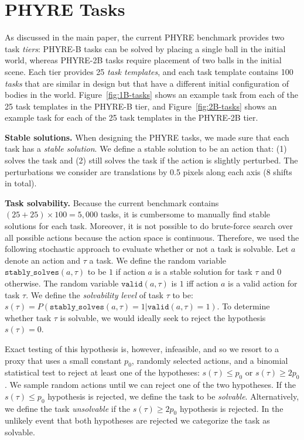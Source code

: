 \documentclass{article}
\begin{document}
\section{PHYRE Tasks}

As discussed in the main paper, the current PHYRE benchmark provides two task \emph{tiers}:
PHYRE-B tasks can be solved by placing a single ball in the initial world, whereas PHYRE-2B tasks require placement of two balls in the initial scene. Each tier provides 25 \emph{task templates},
and each task template contains 100 \emph{tasks} that are similar in design but that have a different initial configuration of bodies in the world. Figure~\ref{fig:1B-tasks} shows an example task from each of the 25 task templates in
the PHYRE-B tier, and Figure~\ref{fig:2B-tasks} shows an example task for each of
the 25 task templates in the PHYRE-2B tier.

\noindent\textbf{Stable solutions.} When designing the PHYRE tasks, we made sure that each task has a \emph{stable solution}. We define a stable solution to be an action that: (1) solves the task and (2) still solves the task if the action is slightly perturbed. The perturbations we consider are translations by 0.5 pixels along each axis (8 shifts in total).

\noindent\textbf{Task solvability.} Because the current benchmark contains $(25+25) \times 100 = 5,000$ tasks, it is cumbersome to manually find stable solutions for each task. Moreover, it is not possible to do brute-force search over all possible actions because the action space is continuous.
Therefore, we used the following stochastic approach to evaluate whether or not a task is solvable.
Let $a$ denote an action and $\tau$ a task. We define the random variable $\texttt{stably\_solves}(a, \tau)$ to be $1$ if action $a$ is a stable solution for task $\tau$ and $0$ otherwise. The random variable $\texttt{valid}(a, \tau)$ is $1$ iff action $a$ is a valid action for task $\tau$. We define the \emph{solvability level} of task $\tau$ to be: $s(\tau) = P(\texttt{stably\_solves}(a, \tau) = 1 | \texttt{valid}(a, \tau) = 1)$. To determine whether task $\tau$ is solvable, we would ideally seek to reject the hypothesis $s(\tau) = 0$.

Exact testing of this hypothesis is, however, infeasible, and so we resort to a proxy that uses a small constant $p_0$, randomly selected actions, and a binomial statistical test to reject at least one of the hypotheses: $s(\tau) \leq p_0$ or $s(\tau) \geq 2p_0$. We sample random actions until we can reject one of the two hypotheses. If the $s(\tau) \leq p_0$ hypothesis is rejected, we define the task to be \emph{solvable}. Alternatively, we define the task \emph{unsolvable} if the $s(\tau) \geq 2p_0$ hypothesis is rejected. In the unlikely event that both hypotheses are rejected we categorize the task as solvable.
\end{document}
